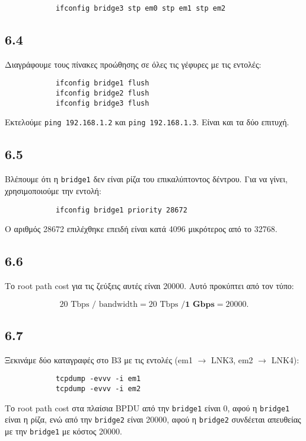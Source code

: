 \documentclass[a4paper, 12pt]{article}
\begin{document}
		\begin{verbatim}
			ifconfig bridge3 stp em0 stp em1 stp em2
		\end{verbatim}

	\subsection*{6.4}
		Διαγράφουμε τους πίνακες προώθησης σε όλες τις γέφυρες με τις εντολές:
		
		\begin{verbatim}
			ifconfig bridge1 flush
			ifconfig bridge2 flush
			ifconfig bridge3 flush
		\end{verbatim}

		Εκτελούμε \verb|ping 192.168.1.2| και \verb|ping 192.168.1.3|. Είναι και τα δύο επιτυχή.

	\subsection*{6.5}
		Βλέπουμε ότι η \verb|bridge1| δεν είναι ρίζα του επικαλύπτοντος δέντρου. Για να γίνει, χρησιμοποιούμε την εντολή: 
		
		\begin{verbatim}
			ifconfig bridge1 priority 28672
		\end{verbatim}
		
		Ο αριθμός 28672 επιλέχθηκε επειδή είναι κατά 4096 μικρότερος από το 32768.

	\subsection*{6.6}
		Το root path cost για τις ζεύξεις αυτές είναι 20000. Αυτό προκύπτει από τον τύπο:
		
		\[
			20 \text{ Tbps } / \text{ bandwidth} = 20 \text{ Tbps } / \textbf{1 Gbps} = 20000.
		\]

	\subsection*{6.7}
		Ξεκινάμε δύο καταγραφές στο B3 με τις εντολές (em1 $\rightarrow$ LNK3, em2 $\rightarrow$ LNK4): 
		
		\begin{verbatim}
			tcpdump -evvv -i em1
			tcpdump -evvv -i em2
		\end{verbatim}

		Το root path cost στα πλαίσια BPDU από την \verb|bridge1| είναι 0, αφού η \verb|bridge1| είναι η ρίζα, ενώ από την \verb|bridge2| είναι 20000, αφού η \verb|bridge2| συνδέεται απευθείας με την \verb|bridge1| με κόστος 20000.
		
\end{document}
